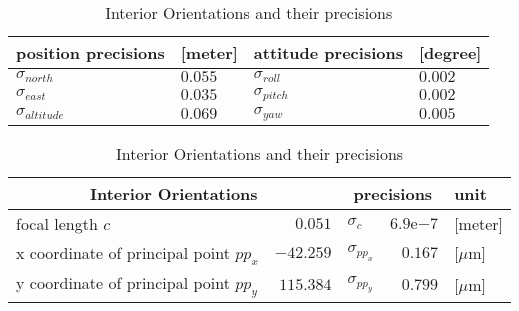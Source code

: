 \begin{table}[!h]
	\centering
	\begin{tabular}{ll|ll}
		\toprule
		position precisions  &[meter]  & attitude precisions & [degree]\\
		\midrule
		$\sigma_{north}$     & $0.055$ & $\sigma_{roll}$  & $0.002$\\
		$\sigma_{east}$      & $0.035$ & $\sigma_{pitch}$ & $0.002$\\
		$\sigma_{altitude}$  & $0.069$ & $\sigma_{yaw}$   & $0.005$\\
		\bottomrule
	\end{tabular}
	\caption{Precisions of Exterior Orientations}
	\label{tab:EOprecision}
	\vspace{0.5cm}
	\centering
	\begin{tabular}{lr|lr|l}
		\toprule
		\multicolumn{2}{c|}{Interior Orientations}  & \multicolumn{2}{c|}{precisions} & unit\\
		\midrule
		focal length $c$                       &   $0.051$ & $\sigma_c$      & $6.9\mathrm{e}{-7}$ & [meter]\\
		x coordinate of principal point $pp_x$ & $-42.259$ & $\sigma_{pp_x}$ & $0.167$             &[$\mu$m]\\
		y coordinate of principal point $pp_y$ & $115.384$ & $\sigma_{pp_y}$ & $0.799$             &[$\mu$m]\\
		\bottomrule
	\end{tabular}
	\caption{Interior Orientations and their precisions}
	\label{tab:IOprecision}
\end{table}


